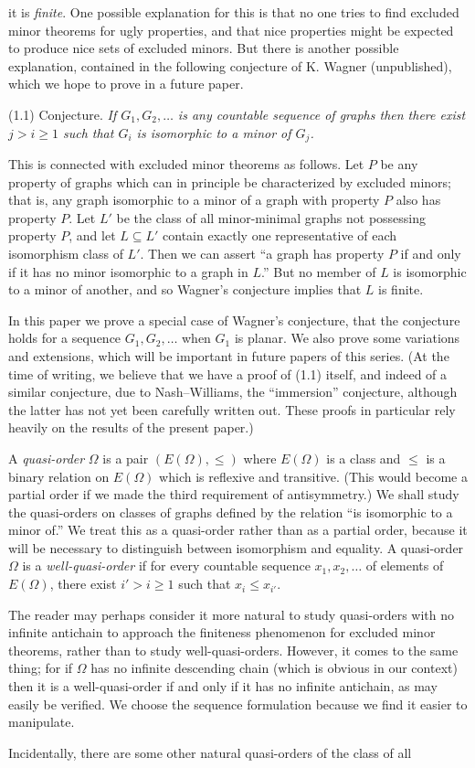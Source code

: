 \noindent it is \textit{finite}. One possible explanation for this is that no one tries to find excluded minor theorems for ugly properties, and that nice properties might be expected to produce nice sets of excluded minors. But there is another possible explanation, contained in the following conjecture of K. Wagner (unpublished), which we hope to prove in a future paper.

\stmt
(1.1) Conjecture. \textit{If $G_1, G_2, \dots$ is any countable sequence of graphs then there exist $j > i \ge 1$ such that $G_i$ is isomorphic to a minor of $G_j$.}

This is connected with excluded minor theorems as follows. Let $P$ be any property of graphs which can in principle be characterized by excluded minors; that is, any graph isomorphic to a minor of a graph with property $P$ also has property $P$. Let $L'$ be the class of all minor-minimal graphs not possessing property $P$, and let $L \subseteq L'$ contain exactly one representative of each isomorphism class of $L'$. Then we can assert ``a graph has property $P$ if and only if it has no minor isomorphic to a graph in $L$.'' But no member of $L$ is isomorphic to a minor of another, and so Wagner's conjecture implies that $L$ is finite.

In this paper we prove a special case of Wagner's conjecture, that the conjecture holds for a sequence $G_1, G_2, \dots$ when $G_1$ is planar. We also prove some variations and extensions, which will be important in future papers of this series. (At the time of writing, we believe that we have a proof of (1.1) itself, and indeed of a similar conjecture, due to Nash--Williams, the ``immersion'' conjecture, although the latter has not yet been carefully written out. These proofs in particular rely heavily on the results of the present paper.)

A \textit{quasi-order} $\Omega$ is a pair $(E(\Omega), \le)$ where $E(\Omega)$ is a class and $\le$ is a binary relation on $E(\Omega)$ which is reflexive and transitive. (This would become a partial order if we made the third requirement of antisymmetry.) We shall study the quasi-orders on classes of graphs defined by the relation ``is isomorphic to a minor of.'' We treat this as a quasi-order rather than as a partial order, because it will be necessary to distinguish between isomorphism and equality. A quasi-order $\Omega$ is a \textit{well-quasi-order} if for every countable sequence $x_1, x_2, \dots$ of elements of $E(\Omega)$, there exist $i' > i \ge 1$ such that $x_i \le x_{i'}$.

The reader may perhaps consider it more natural to study quasi-orders with no infinite antichain to approach the finiteness phenomenon for excluded minor theorems, rather than to study well-quasi-orders. However, it comes to the same thing; for if $\Omega$ has no infinite descending chain (which is obvious in our context) then it is a well-quasi-order if and only if it has no infinite antichain, as may easily be verified. We choose the sequence formulation because we find it easier to manipulate.

Incidentally, there are some other natural quasi-orders of the class of all
